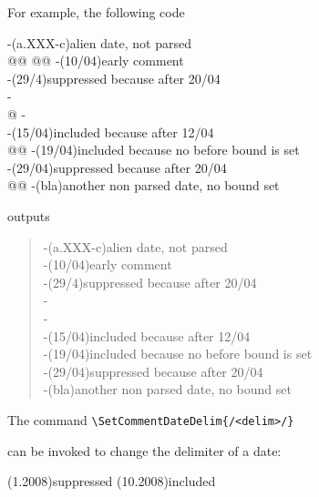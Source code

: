 \documentclass[11pt]{article}
\let\cmd=\lstinline
\def\cmdmp{\lstinline[style=mp]}
\newcommand{\doccmd}[2][]{%
	\marginpar[%
		\leavevmode%
		\raggedleft%
		\fbox{\cmdmp'#2'}%
		\scriptsize\it\ #1%
	]{%
		\leavevmode%
		\raggedright%
		\fbox{\cmdmp'#2'}%
		\scriptsize\it\ #1%
	}%
}
\begin{document}
For example, the following code
\begin{latexex}
-\comment*[fz](a.XXX-c){alien date, not parsed}\\
@@
@@
-\comment*[fz](10/04){early comment}\\
-\comment*[fz](29/4){suppressed because after 20/04}\\
-\\
@\ExcludeNonDatedComments@
-\\
-\comment*[fz](15/04){included because after 12/04}\\
@\NoCommentsBefore{}@ %
-\comment*[fz](19/04){included because no before bound is set}\\
-\comment*[fz](29/04){suppressed because after 20/04}\\
@\NoCommentsAfter{}@ %
-\comment*[fz](bla){another non parsed date, no bound set}
\end{latexex}
outputs
\begin{quote}
-\comment*[fz](a.XXX-c){alien date, not parsed}\\
-\comment*[fz](10/04){early comment}\\
-\comment*[fz](29/4){suppressed because after 20/04}\\
-\\
\ExcludeNonDatedComments
-\\
-\comment*[fz](15/04){included because after 12/04}\\
\NoCommentsBefore{} %
-\comment*[fz](19/04){included because no before bound is set}\\
-\comment*[fz](29/04){suppressed because after 20/04}\\
\NoCommentsAfter{} %
-\comment*[fz](bla){another non parsed date, no bound set}
\end{quote}

The command \cmd'\SetCommentDateDelim{/<delim>/}'\doccmd{\\SetCommentDateDelim}
can be invoked to change the delimiter of a date:
\begin{latexex}
\comment*[jlp](1.2008){suppressed}
\comment*[jlp](10.2008){included}
\end{latexex}
\end{document}
